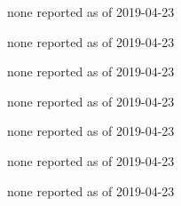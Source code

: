 
\begin{DoxyRefList}
\item[\label{bug__bug000001}%
\hypertarget{bug__bug000001}{}%
Class \hyperlink{classGenerator}{Generator} ]none reported as of 2019-\/04-\/23  
\item[\label{bug__bug000002}%
\hypertarget{bug__bug000002}{}%
Class \hyperlink{classLaser}{Laser} ]none reported as of 2019-\/04-\/23  
\item[\label{bug__bug000003}%
\hypertarget{bug__bug000003}{}%
Class \hyperlink{classRadar}{Radar} ]none reported as of 2019-\/04-\/23  
\item[\label{bug__bug000004}%
\hypertarget{bug__bug000004}{}%
Class \hyperlink{classRanger}{Ranger} ]none reported as of 2019-\/04-\/23  
\item[\label{bug__bug000005}%
\hypertarget{bug__bug000005}{}%
Class \hyperlink{classRangerFusion}{Ranger\+Fusion} ]none reported as of 2019-\/04-\/23  
\item[\label{bug__bug000006}%
\hypertarget{bug__bug000006}{}%
Class \hyperlink{classRangerFusionInterface}{Ranger\+Fusion\+Interface} ]none reported as of 2019-\/04-\/23  
\item[\label{bug__bug000007}%
\hypertarget{bug__bug000007}{}%
Class \hyperlink{classRangerInterface}{Ranger\+Interface} ]none reported as of 2019-\/04-\/23 
\end{DoxyRefList}